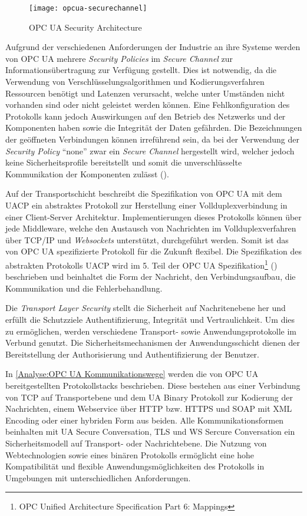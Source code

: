 \begin{figure}[h]
  \centering
  \texttt{[image: opcua-securechannel]}
  \caption{OPC UA Security Architecture} 
  \label{Analyse:OPC UA Security Architecture}
\end{figure}

\clearpage

Aufgrund der verschiedenen Anforderungen der Industrie an ihre Systeme werden von \ac{OPC UA} mehrere \textit{Security Policies} im \textit{Secure Channel} zur Informationsübertragung zur Verfügung gestellt. Dies ist notwendig, da die Verwendung von Verschlüsselungsalgorithmen und Kodierungsverfahren Ressourcen benötigt und Latenzen verursacht, welche unter Umständen nicht vorhanden sind oder nicht geleistet werden können. Eine Fehlkonfiguration des Protokolls kann jedoch Auswirkungen auf den Betrieb des Netzwerks und der Komponenten haben sowie die Integrität der Daten gefährden. Die Bezeichnungen der geöffneten Verbindungen können irreführend sein, da bei der Verwendung der \textit{Security Policy} "`none"' zwar ein \textit{Secure Channel} hergestellt wird, welcher jedoch keine Sicherheitsprofile bereitstellt und somit die unverschlüsselte Kommunikation der Komponenten zulässt (\cite{opcpt7}).

Auf der Transportschicht beschreibt die Spezifikation von \ac{OPC UA} mit dem \ac{UACP} ein abstraktes Protokoll zur Herstellung einer Vollduplexverbindung in einer Client-Server Architektur. Implementierungen dieses Protokolls können über jede Middleware, welche den Austausch von Nachrichten im Vollduplexverfahren über \ac{TCP}/\ac{IP} und \textit{Websockets} unterstützt, durchgeführt werden. Somit ist das von \ac{OPC UA} spezifizierte Protokoll für die Zukunft flexibel. Die Spezifikation des abstrakten Protokolls \ac{UACP} wird im 5. Teil der \ac{OPC UA} Spezifikation\footnote{OPC Unified Architecture Specification Part 6: Mappings} (\cite{opcpt5}) beschrieben und beinhaltet die Form der Nachricht, den Verbindungsaufbau, die Kommunikation und die Fehlerbehandlung.

Die \textit{Transport Layer Security} stellt die Sicherheit auf Nachritenebene her und erfüllt die Schutzziele Authentifizierung, Integrität und Vertraulichkeit. Um dies zu ermöglichen, werden verschiedene Transport- sowie Anwendungsprotokolle im Verbund genutzt. Die Sicherheitsmechanismen der Anwendungsschicht dienen der Bereitstellung der Authorisierung und Authentifizierung der Benutzer.

In \autoref{Analyse:OPC UA Kommunikationswege} werden die von \ac{OPC UA} bereitgestellten Protokollstacks beschrieben. Diese bestehen aus einer Verbindung von \ac{TCP} auf Transportebene und dem \ac{UA} Binary Protokoll zur Kodierung der Nachrichten, einem Webservice über \ac{HTTP} bzw. \ac{HTTPS} und \ac{SOAP} mit \ac{XML} Encoding oder einer hybriden Form aus beiden. Alle Kommunikationsformen beinhalten mit \ac{UA} Secure Conversation, \ac{TLS} und \ac{WS} Sercure Conversation ein Sicherheitsmodell auf Transport- oder Nachrichtebene. Die Nutzung von Webtechnologien sowie eines binären Protokolls ermöglicht eine hohe Kompatibilität und flexible Anwendungsmöglichkeiten des Protokolls in Umgebungen mit unterschiedlichen Anforderungen.

